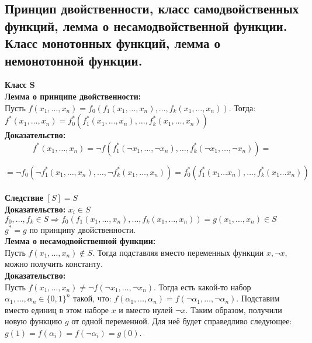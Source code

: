 \subsection{Принцип двойственности, класс самодвойственных функций, лемма о несамодвойственной функции. Класс монотонных функций, лемма о немонотонной функции.}
\textbf{Класс S}\\

\textbf{Лемма о принципе двойственности:}\\

Пусть $f(x_1,\ldots,x_n) = f_0(f_1(x_1,\ldots,x_n),\ldots,f_k(x_1,\ldots,x_n))$. Тогда:
$f^*(x_1,\ldots,x_n) = f_0^*(f_1^*(x_1,\ldots,x_n),\ldots,f_k^*(x_1,\ldots,x_n))$\\

\noindent \textbf{Доказательство:}\\

$$f^*(x_1,\ldots,x_n) = \neg f(f_1^*(\neg x_1, \ldots, \neg x_n), \ldots, f_k^*(\neg x_1, \ldots, \neg x_n)) = $$

$$= \neg f_0(\neg f_1^*(x_1, \ldots, x_n), \ldots, \neg f_k^*(x_1, \ldots, x_n)) = f_0^*(f_1^*(x_1 \ldots x_n), \ldots, f_k^*(x_1 \ldots x_n))$$\\

\textbf{Следствие} $[S] = S$\\

\noindent \textbf{Доказательство:} $x_i \in S$\\

$f_0,\ldots,f_k \in S \Rightarrow f_0(f_1(x_1,\ldots,x_n),\ldots,f_k(x_1,\ldots,x_n)) = g(x_1,\ldots,x_n) \in S$\\

$g^* = g$ по принципу двойственности.\\

\textbf{Лемма о несамодвойственной функции:}\\

Пусть $f(x_1, \ldots, x_n) \notin S$. Тогда подставляя вместо переменных функции $x, \neg x$, можно получить константу.\\

\noindent \textbf{Доказательство:}\\

Пусть $f(x_1,\ldots,x_n) \neq \neg f(\neg x_1, \ldots, \neg x_n)$. Тогда есть какой-то набор $\alpha_1, \ldots, \alpha_n \in \{0, 1\}^n$ такой, что:
$f(\alpha_1, \ldots, \alpha_n) = f(\neg \alpha_1, \ldots, \neg \alpha_n)$.
Подставим вместо единиц в этом наборе $x$ и вместо нулей $\neg x$. Таким образом, получили новую функцию $g$ от одной переменной. Для неё будет справедливо следующее:
$g(1) = f(\alpha_i) = f(\neg \alpha_i) = g(0)$.\\

